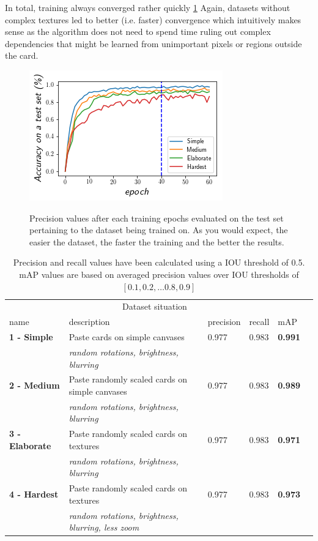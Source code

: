 \documentclass[a4paper]{article}
\begin{document}
In total, training always converged rather quickly \ref{fig:curve} Again, datasets without complex textures led to better (i.e. faster) convergence which intuitively makes sense as the algorithm does not need to spend time ruling out complex dependencies that might be learned from unimportant pixels or regions outside the card.\\
\begin{figure}

\includegraphics[scale=1]{loss}
\label{fig:curve}
\caption{Precision values after each training epochs evaluated on the test set pertaining to the dataset being trained on. As you would expect, the easier the dataset, the faster the training and the better the results. }


\end{figure}
\begin{table}[h]


\begin{tabular}{lllllr}
\hline
\multicolumn{5}{c}{Dataset situation} \\
\cline{1-2}
name    & description  & precision & recall & mAP \\
\hline
\textbf{1 - Simple}      & Paste cards on simple canvases    &  0.977  & 0.983 & \textbf{0.991} \\
          & \textit{random rotations, brightness, blurring}     & & & \\
\textbf{2 - Medium}      & Paste randomly scaled cards on simple canvases & 0.977 & 0.983 & \textbf{0.989} \\
          & \textit{random rotations, brightness, blurring}     & & & \\
\textbf{3 - Elaborate}       & Paste randomly scaled cards on textures & 0.977 & 0.983 & \textbf{0.971} \\
          & \textit{random rotations, brightness, blurring}     & & & \\
\textbf{4 - Hardest} & Paste randomly scaled cards on textures & 0.977 & 0.983 & \textbf{0.973} \\
          & \textit{random rotations, brightness, blurring, less zoom}     & & & \\
\hline


\end{tabular}
\caption{Precision and recall values have been calculated using a IOU threshold of 0.5. mAP values are based on averaged precision values over IOU thresholds of $[0.1, 0.2, \dots 0.8, 0.9] $  }
\label{tab:res}
\end{table}
\end{document}
